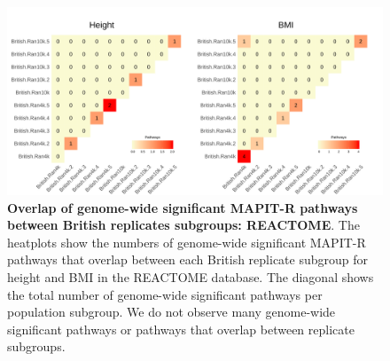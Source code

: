 \documentclass[12pt,a4paper]{article}
\begin{document}
\begin{landscape}
\begin{figure}[htbp]
\centering
\includegraphics[scale=.2]{Images/Supp/InterPath_Supp_Figure_BritReps_Heatplots_REACTOME_vs3.png}
\caption[TBD]{\textbf{Overlap of genome-wide significant MAPIT-R pathways between British replicates subgroups: REACTOME}. The heatplots show the numbers of genome-wide significant MAPIT-R pathways that overlap between each British replicate subgroup for height and BMI in the REACTOME database. The diagonal shows the total number of genome-wide significant pathways per population subgroup. We do not observe many genome-wide significant pathways or pathways that overlap between replicate subgroups.}
\label{InterPath-Supp-Figure-BritReps-Heatplots-AllPaths-REACTOME}
\end{figure}
\clearpage
\end{landscape}
\renewcommand{\thefigure}{\arabic{figure}}
\end{document}
